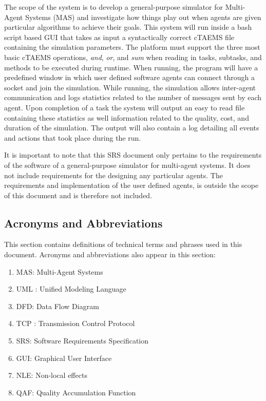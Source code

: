 \documentclass{article}
\begin{document}
The scope of the system is to develop a general-purpose simulator for Multi-Agent Systems (MAS) and investigate how things play out when agents are given particular algorithms to achieve their goals. This system will run inside a bash script based GUI that takes as input a syntactically correct cTAEMS file containing the simulation parameters. The platform must support the three most basic cTAEMS operations, \textit{and}, \textit{or}, and \textit{sum} when reading in tasks, subtasks, and methods to be executed during runtime. When running, the program will have a predefined window in which user defined software agents can connect through a socket and join the simulation. While running, the simulation allows inter-agent communication and logs statistics related to the number of messages sent by each agent.  Upon completion of a task the system will output an easy to read file containing these statistics as well information related to the quality, cost, and duration of the simulation. The output will also contain a log detailing all events and actions that took place during the run.

It is important to note that this SRS document only pertains to the requirements of the software of a general-purpose simulator for multi-agent systems. It does not include requirements for the designing any particular agents.  The requirements and implementation of the user defined agents, is outside the scope of this document and is therefore not included. 

\subsection{Acronyms and Abbreviations}

This section contains definitions of technical terms and phrases used in this document. Acronyms and abbreviations also appear in this section:

\begin{enumerate}
\item{MAS: Multi-Agent Systems}
\item{UML : Unified Modeling Language}
\item{DFD: Data Flow Diagram}
\item{TCP : Transmission Control Protocol}
\item{SRS: Software Requirements Specification}
\item{GUI: Graphical User Interface}
\item{NLE: Non-local effects}
\item{QAF: Quality Accumulation Function}
\end{enumerate}
\end{document}

